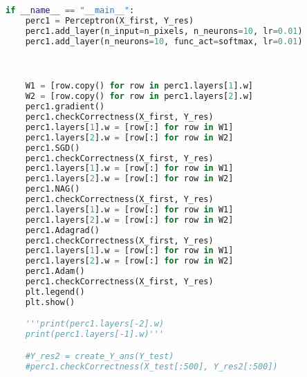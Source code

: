\documentclass[a4paper, 14pt]{extarticle}
\begin{document}
\begin{lstlisting}[language=Python,caption={main.py},label={lst:code1}]
if __name__ == "__main__":
    perc1 = Perceptron(X_first, Y_res)
    perc1.add_layer(n_input=n_pixels, n_neurons=10, lr=0.01)
    perc1.add_layer(n_neurons=10, func_act=softmax, lr=0.01)



    W1 = [row.copy() for row in perc1.layers[1].w]
    W2 = [row.copy() for row in perc1.layers[2].w]
    perc1.gradient()
    perc1.checkCorrectness(X_first, Y_res)
    perc1.layers[1].w = [row[:] for row in W1]
    perc1.layers[2].w = [row[:] for row in W2]
    perc1.SGD()
    perc1.checkCorrectness(X_first, Y_res)
    perc1.layers[1].w = [row[:] for row in W1]
    perc1.layers[2].w = [row[:] for row in W2]
    perc1.NAG()
    perc1.checkCorrectness(X_first, Y_res)
    perc1.layers[1].w = [row[:] for row in W1]
    perc1.layers[2].w = [row[:] for row in W2]
    perc1.Adagrad()
    perc1.checkCorrectness(X_first, Y_res)
    perc1.layers[1].w = [row[:] for row in W1]
    perc1.layers[2].w = [row[:] for row in W2]
    perc1.Adam()
    perc1.checkCorrectness(X_first, Y_res)
    plt.legend()
    plt.show()

    '''print(perc1.layers[-2].w)
    print(perc1.layers[-1].w)'''

    #Y_res2 = create_Y_ans(Y_test)
    #perc1.checkCorrectness(X_test[:500], Y_res2[:500])
\end{lstlisting}
\end{document}

